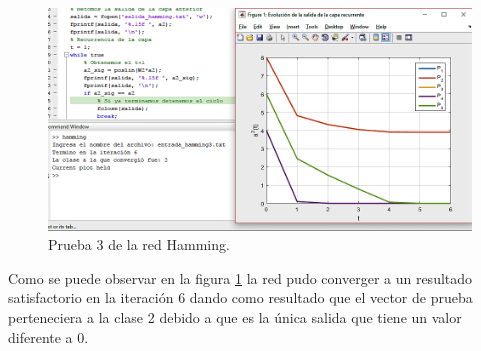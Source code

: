\begin{figure}[H]
    \begin{center}
        \includegraphics[width=16cm]{img/hamming/hamming3.png}
        \caption{Prueba 3 de la red Hamming.}
        \label{fig:hamming3}
    \end{center}
\end{figure}
Como se puede observar en la figura \ref{fig:hamming3} la red pudo converger a un resultado satisfactorio en la iteración 6 dando como resultado que el vector de prueba perteneciera a la clase 2 debido a que es la única salida que tiene un valor diferente a 0.
\newpage